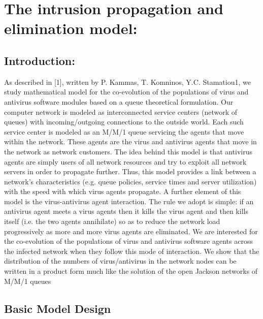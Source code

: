\chapter{The intrusion propagation and elimination model:}

\section{Introduction:}

As described in [1], written by P. Kammas, T. Komninos, Y.C. Stamatiou1, we study mathematical model for the co-evolution of the populations of virus and antivirus software modules based on a queue theoretical formulation. Our computer network is modeled as
interconnected service centers (network of queues) with
incoming/outgoing connections to the outside world. Each
such service center is modeled as an M/M/1 queue servicing
the agents that move within the network. These agents are
the virus and antivirus agents that move in the network
as network customers. The idea behind this model is that antivirus
agents are simply users of all network resources and
try to exploit all network servers in order to propagate further.
Thus, this model provides a link between a network’s
characteristics (e.g. queue policies, service times and server
utilization) with the speed with which virus agents propagate.
A further element of this model is the virus-antivirus
agent interaction. The rule we adopt is simple: if an antivirus
agent meets a virus agents then it kills the virus agent
and then kills itself (i.e. the two agents annihilate) so as to reduce the network load progressively as more and more virus
agents are eliminated. We are interested for the co-evolution
of the populations of virus and antivirus software agents
across the infected network when they follow this mode of
interaction. We show that the distribution of the numbers of
virus/antivirus in the network nodes can be written in a product
form much like the solution of the open Jackson networks
of M/M/1 queues

\section{Basic Model Design}

